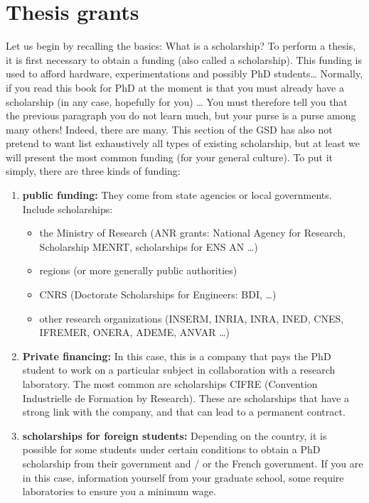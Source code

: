 \section{Thesis grants}
Let us begin by recalling the basics: What is a scholarship?
To perform a thesis, it is first necessary to obtain a funding (also called a scholarship).
This funding is used to afford hardware, experimentations and possibly PhD students\dots
{}
Normally, if you read this book for PhD at the moment is that you must already have a scholarship (in any case, hopefully for you) \dots
You must therefore tell you that the previous paragraph you do not learn much, but your purse is a purse among many others!
Indeed, there are many.
This section of the GSD has also not pretend to want list exhaustively all types of existing scholarship, but at least we will present the most common funding (for your general culture).
To put it simply, there are three kinds of funding:
\begin{enumerate}
  \item \textbf{public funding:} They come from state agencies or local governments. Include scholarships:
  \begin{itemize}
    \item the Ministry of Research (ANR grants: National Agency for Research, Scholarship MENRT, scholarships for ENS AN \dots)
    \item regions (or more generally public authorities)
    \item CNRS (Doctorate Scholarships for Engineers: BDI, \dots)
    \item other research organizations (INSERM, INRIA, INRA, INED, CNES, IFREMER, ONERA, ADEME, ANVAR \dots)
  \end{itemize}
  \item \textbf{Private financing:} In this case, this is a company that pays the PhD student to work on a particular subject in collaboration with a research laboratory. The most common are scholarships CIFRE (Convention Industrielle de Formation by Research). These are scholarships that have a strong link with the company, and that can lead to a permanent contract.
  \item \textbf{scholarships for foreign students:} Depending on the country, it is possible for some students under certain conditions to obtain a PhD scholarship from their government and / or the French government. If you are in this case, information yourself from your graduate school, some require laboratories to ensure you a minimum wage.
\end{enumerate}

